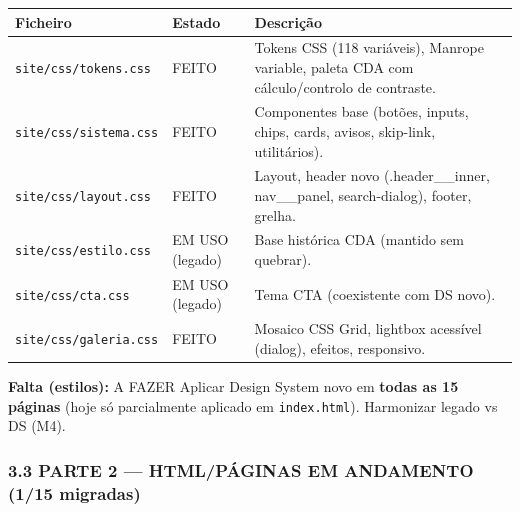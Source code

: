 {\def\LTcaptype{none} %
\begin{longtable}[]{@{}
  >{\raggedright\arraybackslash}p{}
  >{\raggedright\arraybackslash}p{}
  >{\raggedright\arraybackslash}p{}@{}}
\toprule\noalign{}
\begin{minipage}[b]{\linewidth}\raggedright
Ficheiro
\end{minipage} & \begin{minipage}[b]{\linewidth}\raggedright
Estado
\end{minipage} & \begin{minipage}[b]{\linewidth}\raggedright
Descrição
\end{minipage} \\
\midrule\noalign{}
\endhead
\bottomrule\noalign{}
\endlastfoot
\texttt{site/css/tokens.css} & {FEITO} & Tokens CSS (118 variáveis),
Manrope variable, paleta CDA com cálculo/controlo de contraste. \\
\texttt{site/css/sistema.css} & {FEITO} & Componentes base (botões,
inputs, chips, cards, avisos, skip-link, utilitários). \\
\texttt{site/css/layout.css} & {FEITO} & Layout, header novo
(.header\_\_inner, nav\_\_panel, search-dialog), footer, grelha. \\
\texttt{site/css/estilo.css} & {EM USO (legado)} & Base histórica CDA
(mantido sem quebrar). \\
\texttt{site/css/cta.css} & {EM USO (legado)} & Tema CTA (coexistente
com DS novo). \\
\texttt{site/css/galeria.css} & {FEITO} & Mosaico CSS Grid, lightbox
acessível (dialog), efeitos, responsivo. \\
\end{longtable}
}

\textbf{Falta (estilos):} {A FAZER} Aplicar Design System novo em
\textbf{todas as 15 páginas} (hoje só parcialmente aplicado em
\texttt{index.html}). Harmonizar legado vs DS (M4).

\subsubsection{\texorpdfstring{3.3 PARTE 2 --- HTML/PÁGINAS {EM
ANDAMENTO (1/15
migradas)}}{3.3 PARTE 2 --- HTML/PÁGINAS EM ANDAMENTO (1/15 migradas)}}\label{parte-2-htmlpuxe1ginas-em-andamento-115-migradas}

